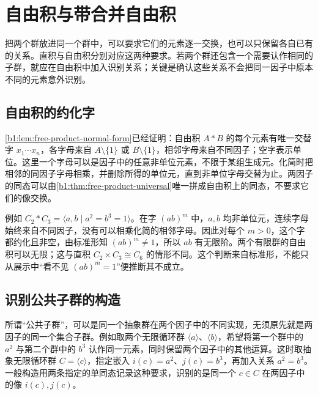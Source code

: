 
\section{自由积与带合并自由积}
\label{b1:sec:C01}

把两个群放进同一个群中，可以要求它们的元素逐一交换，也可以只保留各自已有的关系。直积与自由积分别对应这两种要求。若两个群还包含一个需要认作相同的子群，就应在自由积中加入识别关系；关键是确认这些关系不会把同一因子中原本不同的元素意外识别。

\subsection{自由积的约化字}
\label{b1:subsec:C01:01}

\cref{b1:lem:free-product-normal-form}已经证明：自由积 \(A*B\) 的每个元素有唯一交替字 \(x_1\cdots x_n\)，各字母来自 \(A\setminus\{1\}\) 或 \(B\setminus\{1\}\)，相邻字母来自不同因子；空字表示单位。这里一个字母可以是因子中的任意非单位元素，不限于某组生成元。化简时把相邻的同因子字母相乘，并删除所得的单位元，直到非单位字母交替为止。两因子的同态可以由\cref{b1:thm:free-product-universal}唯一拼成自由积上的同态，不要求它们的像交换。

\ProseParagraphBreak
例如 \(C_2*C_3=\langle a,b\mid a^2=b^3=1\rangle\)。在字 \((ab)^m\) 中，\(a,b\) 均非单位元，连续字母始终来自不同因子，没有可以相乘化简的相邻字母。因此对每个 \(m>0\)，这个字都约化且非空，由标准形知 \((ab)^m\ne1\)，所以 \(ab\) 有无限阶。两个有限群的自由积可以无限；这与直积 \(C_2\times C_3\cong C_6\) 的情形不同。这个判断来自标准形，不能只从展示中“看不见 \((ab)^m=1\)”便推断其不成立。

\subsection{识别公共子群的构造}
\label{b1:subsec:C01:02}

所谓“公共子群”，可以是同一个抽象群在两个因子中的不同实现，无须原先就是两因子的同一个集合子群。例如取两个无限循环群 \(\langle a\rangle\)、\(\langle b\rangle\)，希望将第一个群中的 \(a^2\) 与第二个群中的 \(b^3\) 认作同一元素，同时保留两个因子中的其他运算。这时取抽象无限循环群 \(C=\langle c\rangle\)，指定嵌入 \(i(c)=a^2\)、\(j(c)=b^3\)，再加入关系 \(a^2=b^3\)。一般构造用两条指定的单同态记录这种要求，识别的是同一个 \(c\in C\) 在两因子中的像 \(i(c),j(c)\)。

